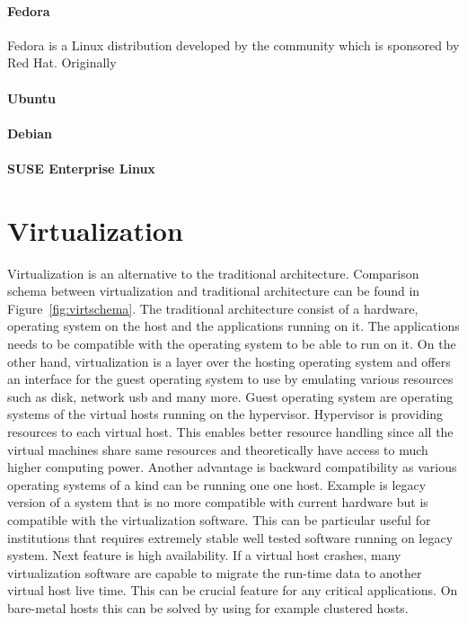 \paragraph{Fedora}
Fedora is a Linux distribution developed by the community which is sponsored by Red Hat. Originally 
\paragraph{Ubuntu}
\paragraph{Debian}
\paragraph{SUSE Enterprise Linux}
\section{Virtualization}
Virtualization is an alternative to the traditional architecture. Comparison schema between virtualization and traditional architecture can be found in  Figure~\ref{fig:virtschema}. The traditional architecture consist of a hardware, operating system on the host and the applications running on it. The applications needs to be compatible with the operating system to be able to run on it. On the other hand, virtualization is a layer over the hosting operating system and offers an interface for the guest operating system to use by emulating various resources such as disk, network usb and many more. Guest operating system are operating systems of the virtual hosts running on the hypervisor. Hypervisor is providing resources to each virtual host. This enables better resource handling since all the virtual machines share same resources and theoretically have access to much higher computing power. Another advantage is backward compatibility as various operating systems of a kind can be running one one host. Example is legacy version of a system that is no more compatible with current hardware but is compatible with the virtualization software. This can be particular useful for institutions that requires extremely stable well tested software running on legacy system. Next feature is high availability. If a virtual host crashes, many virtualization software are capable to migrate the run-time data to another virtual host live time. This can be crucial feature for any critical applications. On bare-metal hosts this can be solved by using for example clustered hosts.

